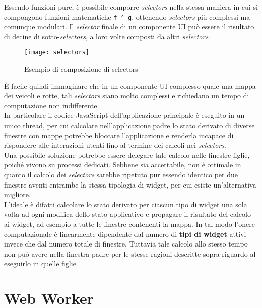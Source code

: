 Essendo funzioni pure, è possibile comporre \textit{selectors} nella stessa maniera in cui si compongono funzioni matematiche \texttt{f ° g}, ottenendo \textit{selectors} più complessi ma comunque modulari. Il \textit{selector} finale di un componente UI può essere il risultato di decine di sotto-\textit{selectors}, a loro volte composti da altri \textit{selectors}.

\begin{figure}[H] 
  \centering 
  \texttt{[image: selectors]} 
  \caption{Esempio di composizione di selectors}
\end{figure}

È facile quindi immaginare che in un componente UI complesso quale una mappa dei veicoli e rotte, tali \textit{selectors} siano molto complessi e richiedano un tempo di computazione non indifferente. \\

In particolare il codice JavaScript dell'applicazione principale è eseguito in un unico thread, per cui calcolare nell'applicazione padre lo stato derivato di diverse finestre con mappe potrebbe bloccare l'applicazione e renderla incapace di rispondere alle interazioni utenti fino al termine dei calcoli nei \textit{selectors}. \\

Una possibile soluzione potrebbe essere delegare tale calcolo nelle finestre figlie, poiché vivono su processi dedicati. Sebbene sia accettabile, non è ottimale in quanto il calcolo dei \textit{selectors} sarebbe ripetuto pur essendo identico per due finestre aventi entrambe la stessa tipologia di widget, per cui esiste un'alternativa migliore. \\

L'ideale è difatti calcolare lo stato derivato per ciascun tipo di widget una sola volta ad ogni modifica dello stato applicativo e propagare il risultato del calcolo ai widget, ad esempio a tutte le finestre contenenti la mappa. In tal modo l'onere computazionale è linearmente dipendente dal numero di \textbf{tipi di widget} attivi invece che dal numero totale di finestre. Tuttavia tale calcolo allo stesso tempo non può avere nella finestra padre per le stesse ragioni descritte sopra riguardo al eseguirlo in quelle figlie.

\section{Web Worker}\label{webworker}

